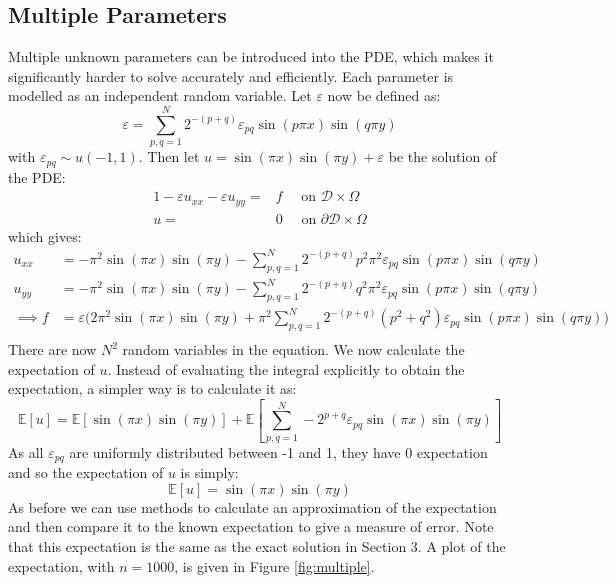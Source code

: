 \documentclass[11pt]{article}
\numberwithin{equation}{section}
\begin{document}
\newpage

\subsection{Multiple Parameters}
Multiple unknown parameters can be introduced into the PDE, which makes it significantly harder to solve accurately and efficiently. Each parameter is modelled as an independent random variable. Let $\varepsilon$ now be defined as:
\begin{equation}
\varepsilon = \sum_{p,q = 1}^N 2^{-(p+q)} \varepsilon_{pq} \sin(p \pi x) \sin(q \pi y)
\end{equation}
with $\varepsilon_{pq} \sim u(-1,1)$. Then let $u = \sin(\pi x)\sin(\pi y) + \varepsilon$ be the solution of the PDE:
\begin{alignat}{1}
-\varepsilon u_{xx} -\varepsilon u_{yy} = {}& f \quad \text{ on } \mathcal{D} \times \Omega \nonumber \\
u = {}& 0 \quad \text{ on } \partial \mathcal{D} \times \Omega
\end{alignat}
which gives:
\begin{equation}
\begin{split}
u_{xx} &= -\pi^2 \sin(\pi x)\sin(\pi y) - \sum_{p,q=1}^N 2^{-(p+q)} p^2 \pi^2 \varepsilon_{pq} \sin(p\pi x)\sin(q\pi y) \\
u_{yy} &= -\pi^2 \sin(\pi x)\sin(\pi y) - \sum_{p,q=1}^N 2^{-(p+q)} q^2 \pi^2 \varepsilon_{pq} \sin(p\pi x)\sin(q\pi y) \\
\implies f &= \varepsilon \Big(2\pi^2 \sin(\pi x) \sin(\pi y) + \pi^2 \sum_{p,q=1}^N 2^{-(p+q)} (p^2 + q^2) \varepsilon_{pq} \sin(p \pi x)\sin(q \pi y) \Big) \\
\end{split}
\end{equation}
There are now $N^2$ random variables in the equation. We now calculate the expectation of $u$. Instead of evaluating the integral explicitly to obtain the expectation, a simpler way is to calculate it as:
\begin{equation}
\mathbb{E}[u] = \mathbb{E}[\sin(\pi x)\sin(\pi y)] + \mathbb{E}\left[\sum_{p,q=1}^N -2^{p+q} \varepsilon_{pq} \sin(\pi x)\sin(\pi y) \right]
\end{equation}
As all $\varepsilon_{pq}$ are uniformly distributed between -1 and 1, they have 0 expectation and so the expectation of $u$ is simply:
\begin{equation}
\mathbb{E}[u] = \sin(\pi x)\sin(\pi y)
\end{equation}
As before we can use methods to calculate an approximation of the expectation and then compare it to the known expectation to give a measure of error. Note that this expectation is the same as the exact solution in Section 3. A plot of the expectation, with $n=1000$, is given in Figure \ref{fig:multiple}.
\end{document}
